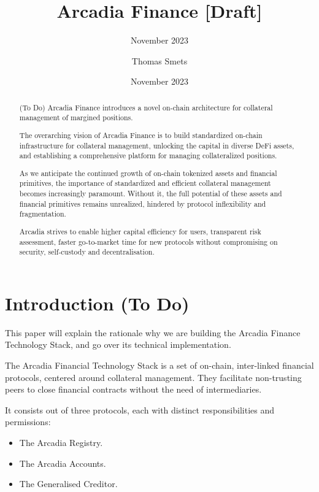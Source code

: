 \documentclass[sigconf,nonacm]{acmart}
\title{Arcadia Finance [Draft]}
\subtitle{November 2023}
\date{November 2023}
\author{Thomas Smets}
\affiliation{
    \institution{Arcadia Finance}
    \city{Brussels}
    \country{Belgium}
}
\begin{document}
\begin{abstract}
    (To Do)
    Arcadia Finance introduces a novel on-chain architecture for collateral management of margined positions.

    The overarching vision of Arcadia Finance is to build standardized on-chain infrastructure for collateral management,
    unlocking the capital in diverse DeFi assets, and establishing a comprehensive platform for managing collateralized positions. 

    As we anticipate the continued growth of on-chain tokenized assets and financial primitives, the importance of standardized and efficient collateral management becomes increasingly paramount.
    Without it, the full potential of these assets and financial primitives remains unrealized, hindered by protocol inflexibility and fragmentation.

    Arcadia strives to enable higher capital efficiency for users, transparent risk assessment, faster go-to-market time for new protocols without compromising on security, self-custody and decentralisation.
\end{abstract}


\maketitle

\section{Introduction (To Do)} 
\label{sec:introduction}
This paper will explain the rationale why we are building the Arcadia Finance Technology Stack,
and go over its technical implementation.

The Arcadia Financial Technology Stack is a set of on-chain, inter-linked financial protocols,
centered around collateral management.
They facilitate non-trusting peers to close financial contracts without the need of intermediaries.

It consists out of three protocols, each with distinct responsibilities and permissions:
\begin{itemize}
\item The Arcadia Registry.
\item The Arcadia Accounts.
\item The Generalised Creditor.
\end{itemize}
\end{document}

